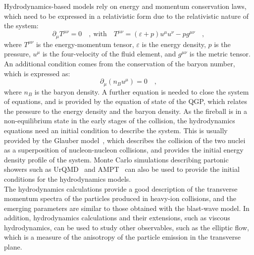 Hydrodynamics-based models rely on energy and momentum conservation laws, which need to be expressed in a relativistic form due to the relativistic nature of the system:
\begin{equation*}
    \partial_\mu T^{\mu\nu} = 0\quad ,~\mathrm{with}\quad T^{\mu\nu} = (\varepsilon + p)u^\mu u^\nu - p g^{\mu\nu}\quad ,
\end{equation*}
where $T^{\mu\nu}$ is the energy-momentum tensor, $\varepsilon$ is the energy density, $p$ is the pressure, $u^\mu$ is the four-velocity of the fluid element, and $g^{\mu\nu}$ is the metric tensor. An additional condition comes from the conservation of the baryon number, which is expressed as:
\begin{equation*}
    \partial_\mu (n_B u^\mu) = 0\quad ,
\end{equation*}
where $n_B$ is the baryon density. A further equation is needed to close the system of equations, and is provided by the equation of state of the QGP, which relates the pressure to the energy density and the baryon density. As the fireball is in a non-equilibrium state in the early stages of the collision, the hydrodynamics equations need an initial condition to describe the system. This is usually provided by the Glauber model~\cite{Miller:2007ri}, which describes the collision of the two nuclei as a superposition of nucleon-nucleon collisions, and provides the initial energy density profile of the system. Monte Carlo simulations describing partonic showers such as UrQMD~\cite{Bleicher:1999xi} and AMPT~\cite{Lin:2004en} can also be used to provide the initial conditions for the hydrodynamics models. \\
The hydrodynamics calculations provide a good description of the transverse momentum spectra of the particles produced in heavy-ion collisions, and the emerging parameters are similar to those obtained with the blast-wave model. In addition, hydrodynamics calculations and their extensions, such as viscous hydrodynamics, can be used to study other observables, such as the elliptic flow, which is a measure of the anisotropy of the particle emission in the transverse plane.

